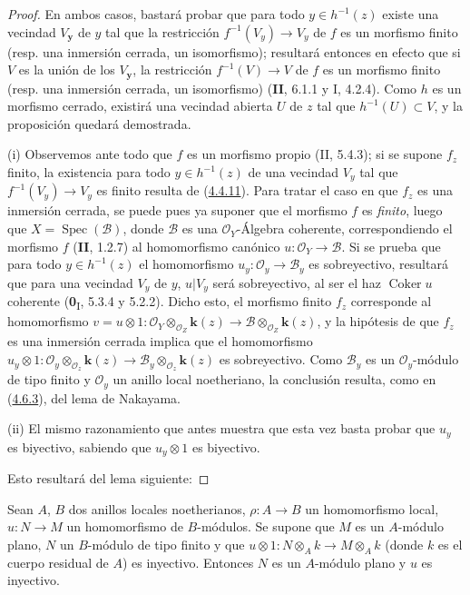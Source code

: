 \begin{proof}
En ambos casos, bastará probar que para todo $y\in h^{-1}(z)$
existe una vecindad $V_{\boldsymbol{y}}$ de $y$ tal que la restricción
$f^{-1}(V_y)\to V_y$ de $f$ es un morfismo finito (resp. una inmersión
cerrada, un isomorfismo); resultará entonces en efecto que si $V$ es la
unión de los $V_{\boldsymbol{y}}$, la restricción $f^{-1}(V)\to V$ de $f$ es un morfismo
finito (resp. una inmersión cerrada, un isomorfismo) (\textbf{II}, 6.1.1 y I, 4.2.4).
Como $h$ es un morfismo cerrado, existirá una vecindad abierta $U$ de $z$
tal que $h^{-1}(U)\subset V$, y la proposición quedará demostrada.

\noindent (i) Observemos ante todo que $f$ es un morfismo propio
(II, 5.4.3); si se
supone $f_z$ finito, la existencia para todo
$y\in h^{-1}(z)$ de una vecindad $V_y$ tal que $f^{-1}(V_y)\to V_y$ es finito
resulta de (\hyperref[III.4.4.11-fr]{4.4.11}).
Para tratar el caso en que $f_z$ es una inmersión cerrada, se puede pues ya
suponer que el morfismo $f$ es \emph{finito}, luego que
$X=\operatorname{Spec}(\mathcal B)$, donde $\mathcal B$ es una
$\mathcal O_Y$-Álgebra coherente, correspondiendo el morfismo $f$ (\textbf{II}, 1.2.7)
al homomorfismo canónico $u:\mathcal O_Y\to\mathcal B$. Si se prueba
que para todo $y\in h^{-1}(z)$ el homomorfismo
$u_y:\mathcal O_y\to\mathcal B_y$ es sobreyectivo, resultará que para una
vecindad $V_y$ de $y$, $u|V_y$ será sobreyectivo, al ser el haz
$\operatorname{Coker}u$ coherente (\textbf{0}\textsubscript{I}, 5.3.4 y 5.2.2).
Dicho esto, el morfismo finito $f_z$ corresponde al homomorfismo
$v=u\otimes1:
\mathcal O_Y\otimes_{\mathcal O_Z}\boldsymbol{k}(z)
\longrightarrow
\mathcal B\otimes_{\mathcal O_Z}\boldsymbol{k}(z)$,
y la hipótesis de que $f_z$ es una inmersión cerrada implica que
el homomorfismo
$u_y\otimes1:
\mathcal O_y\otimes_{\mathcal O_z}\boldsymbol{k}(z)
\longrightarrow
\mathcal B_y\otimes_{\mathcal O_z}\boldsymbol{k}(z)$
es sobreyectivo. Como $\mathcal B_y$ es un $\mathcal O_y$-módulo de tipo
finito y $\mathcal O_y$ un anillo local noetheriano, la conclusión resulta,
como en (\hyperref[III.4.6.3-fr]{4.6.3}), del lema de Nakayama.

\noindent (ii) El mismo razonamiento que antes muestra que
esta vez basta probar que $u_y$ es biyectivo, sabiendo que
$u_y\otimes1$ es biyectivo.

Esto resultará del lema siguiente:
\end{proof}

\begin{lemma}[4.6.7.1]
\label{III.4.6.7.1-fr}
Sean $A$, $B$ dos anillos locales noetherianos,
$\rho:A\to B$ un homomorfismo local, $u:N\to M$ un homomorfismo de
$B$-módulos. Se supone que $M$ es un $A$-módulo plano, $N$ un $B$-módulo
de tipo finito y que
$u\otimes1:N\otimes_Ak\longrightarrow M\otimes_Ak$
(donde $k$ es el cuerpo residual de $A$) es inyectivo. Entonces $N$ es un
$A$-módulo plano y $u$ es inyectivo.
\end{lemma}

